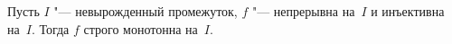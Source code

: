 
Пусть $I$ "--- невырожденный промежуток, $f$ "--- непрерывна на~$I$ и инъективна на~$I$. Тогда $f$ строго монотонна на~$I$.
